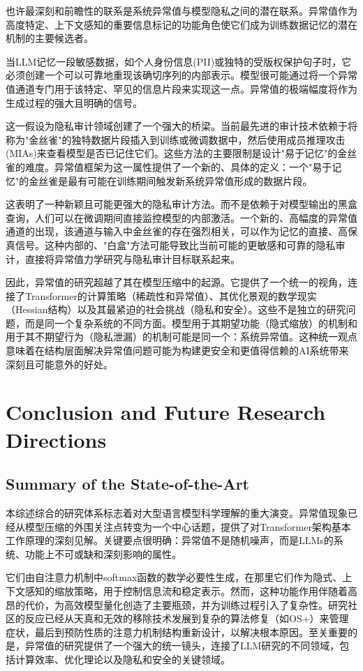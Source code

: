 \documentclass{article}
\begin{document}
也许最深刻和前瞻性的联系是系统异常值与模型隐私之间的潜在联系。异常值作为高度特定、上下文感知的重要信息标记的功能角色使它们成为训练数据记忆的潜在机制的主要候选者。

当LLM记忆一段敏感数据，如个人身份信息(PII)或独特的受版权保护句子时，它必须创建一个可以可靠地重现该确切序列的内部表示。模型很可能通过将一个异常值通道专门用于该特定、罕见的信息片段来实现这一点。异常值的极端幅度将作为生成过程的强大且明确的信号。

这一假设为隐私审计领域创建了一个强大的桥梁。当前最先进的审计技术依赖于将称为"金丝雀"的独特数据片段插入到训练或微调数据中，然后使用成员推理攻击(MIAs)来查看模型是否已记住它们。这些方法的主要限制是设计"易于记忆"的金丝雀的难度。异常值框架为这一属性提供了一个新的、具体的定义：一个"易于记忆"的金丝雀是最有可能在训练期间触发新系统异常值形成的数据片段。

这表明了一种新颖且可能更强大的隐私审计方法。而不是依赖于对模型输出的黑盒查询，人们可以在微调期间直接监控模型的内部激活。一个新的、高幅度的异常值通道的出现，该通道与输入中金丝雀的存在强烈相关，可以作为记忆的直接、高保真信号。这种内部的、"白盒"方法可能导致比当前可能的更敏感和可靠的隐私审计，直接将异常值力学研究与隐私审计目标联系起来。

因此，异常值的研究超越了其在模型压缩中的起源。它提供了一个统一的视角，连接了Transformer的计算策略（稀疏性和异常值）、其优化景观的数学现实（Hessian结构）以及其最紧迫的社会挑战（隐私和安全）。这些不是独立的研究问题，而是同一个复杂系统的不同方面。模型用于其期望功能（隐式缩放）的机制和用于其不期望行为（隐私泄漏）的机制可能是同一个：系统异常值。这种统一观点意味着在结构层面解决异常值问题可能为构建更安全和更值得信赖的AI系统带来深刻且可能意外的好处。

\section{Conclusion and Future Research Directions}

\subsection{Summary of the State-of-the-Art}

本综述综合的研究体系标志着对大型语言模型科学理解的重大演变。异常值现象已经从模型压缩的外围关注点转变为一个中心话题，提供了对Transformer架构基本工作原理的深刻见解。关键要点很明确：异常值不是随机噪声，而是LLMs的系统、功能上不可或缺和深刻影响的属性。

它们由自注意力机制中softmax函数的数学必要性生成，在那里它们作为隐式、上下文感知的缩放策略，用于控制信息流和稳定表示。然而，这种功能作用伴随着高昂的代价，为高效模型量化创造了主要瓶颈，并为训练过程引入了复杂性。研究社区的反应已经从天真和无效的移除技术发展到复杂的算法修复（如OS+）来管理症状，最后到预防性质的注意力机制结构重新设计，以解决根本原因。至关重要的是，异常值的研究提供了一个强大的统一镜头，连接了LLM研究的不同领域，包括计算效率、优化理论以及隐私和安全的关键领域。
\end{document}
